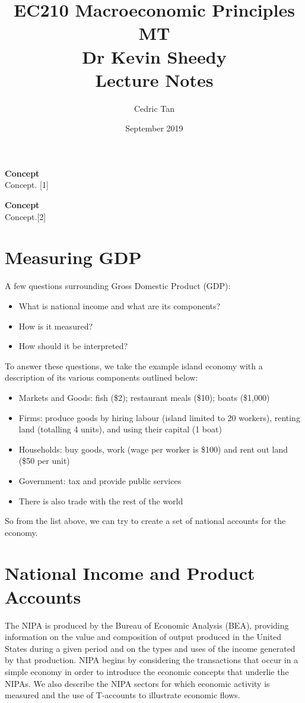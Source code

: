 \documentclass[12pt, letterpaper]{article}
\title{
	{EC210 Macroeconomic Principles MT}\\
	{\large{Dr Kevin Sheedy}}\\
	{\large{Lecture Notes}}
}
\author{Cedric Tan}
\date{September 2019}
\begin{document}
\maketitle
{\small
  \noindent\textbf{Concept}\\
  Concept. \hspace*{\fill}[1]

  \vspace{10pt}
  \noindent\textbf{Concept}\\
  Concept.\hspace*{\fill}[2]

\newpage
\tableofcontents
\newpage

\section{Measuring GDP}
A few questions surrounding Gross Domestic Product (GDP):
\begin{itemize}
	\item What is national income and what are its components?
	\item How is it measured?
	\item How should it be interpreted?
\end{itemize}
To answer these questions, we take the example island economy with a description of its various components outlined below:
\begin{itemize}
	\item Markets and Goods: fish (\$2); restaurant meals (\$10); boats (\$1,000)
	\item Firms: produce goods by hiring labour (island limited to 20 workers), renting land (totalling 4 units), and using their capital (1 boat)
	\item Households: buy goods, work (wage per worker is \$100) and rent out land (\$50 per unit)
	\item Government: tax and provide public services
	\item There is also trade with the rest of the world
\end{itemize}
So from the list above, we can try to create a set of national accounts for the economy.

\vspace{10pt}


\section{National Income and Product Accounts}
The NIPA is produced by the Bureau of Economic Analysis (BEA), providing information on the value and composition of output produced in the United States during a given period and on the types and uses of the income generated by that production. NIPA begins by considering the transactions that occur in a simple economy in order to introduce the economic concepts that underlie the NIPAs. We also describe the NIPA sectors for which economic activity is measured and the use of T-accounts to illustrate economic flows.

}
\end{document}
